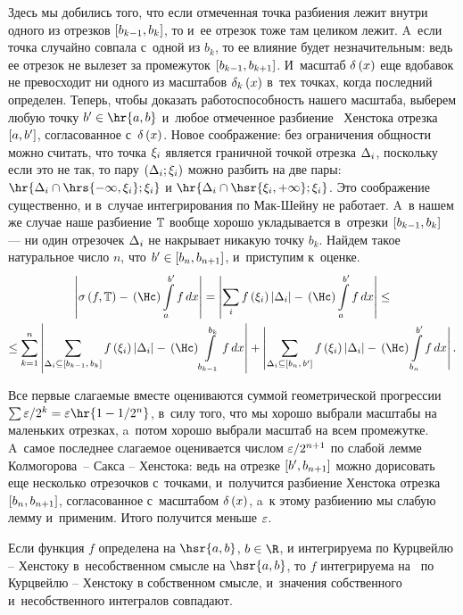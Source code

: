 \documentclass[draft]{article}
\begin{document}
Здесь мы добились того, что если отмеченная точка разбиения лежит
внутри одного из отрезков $\seg[b_{k-1},b_k]$, то и~ее отрезок тоже
там целиком лежит. A~если точка случайно совпала с~одной из $b_k$,
то ее влияние будет незначительным: ведь ее отрезок не вылезет за
промежуток $\seg[b_{k-1},b_{k+1}]$. И~масштаб $\de\atx$ еще вдобавок
не превосходит ни одного из масштабов $\de_k\atx$ в~тех точках,
когда последний определен. Теперь, чтобы доказать работоспособность
нашего масштаба, выберем любую точку $b'\in\hr{a, b}$ и~любое
отмеченное разбиение \Tdixif\ Хенстока отрезка $\seg[a,b']$,
согласованное с~$\dex$. Новое соображение: без ограничения общности
можно считать, что точка $\xi_i$ является граничной точкой отрезка
$\Delta_i$, поскольку если это не так, то пару $\dixi$ можно разбить на
две пары: $\hr{\dei\cap\hrs{-\infty,\xii};\xii}$ и
$\hr{\dei\cap\hsr{\xii,+\infty};\xii}$. Это соображение существенно,
и в~случае интегрирования по Мак-Шейну не работает. A~в нашем же
случае наше разбиение $\mathbb{T}$ вообще хорошо укладывается в~отрезки
$\seg[b_{k-1},b_k]$ --- ни один отрезочек $\Delta_i$ не накрывает
никакую точку $b_k$. Найдем такое натуральное число $n$, что
$b'\in\seg[b_{n},b_{n+1}]$, и~приступим к~оценке.
\begin{multline*}
\abs{\isum(f,\T)-\kurzh\intd[a,b']f,x} = \abs{\sumi\fxildi-\kurzh\intd[a,b']f,x} \le\\ \le
\sum_{k=1}^n\abs{\sum_{\dei\subseteq\seg[b_{k-1},\,b_k]}
\fxildi-\kurzh  \intd[b_{k-1},b_k]{  f},x} + \abs{\sum_{\dei\subseteq\seg[b_n,\,b']}
\fxildi-\kurzh\intd[b_n,b']f,x}.
\end{multline*}

Все первые слагаемые вместе оцениваются суммой геометрической
прогрессии $\sum\ep/2^k=\ep\hr{1-1/2^n}$, в~силу того, что мы хорошо
выбрали масштабы на маленьких отрезках, a~потом хорошо выбрали
масштаб на всем промежутке. A~самое последнее слагаемое оценивается
числом $\varepsilon/2^{n+1}$ по слабой лемме Колмогорова~-- Сакса --
Хенстока: ведь на отрезке $\seg[b',b_{n+1}]$ можно дорисовать еще
несколько отрезочков с~точками, и~получится разбиение Хенстока
отрезка $\seg[b_{n},b_{n+1}]$, согласованное с~масштабом $\dex$, a~к
этому разбиению мы слабую лемму и~применим. Итого получится меньше
$\varepsilon$.

\prlm

\bigskip


Если функция $f$ определена на $\hsr{a, b}$, $b\in\R$, и
интегрируема по Курцвейлю -- Хенстоку в~несобственном смысле на
$\hsr{a, b}$, то $f$ интегрируема на \ab\ по Курцвейлю -- Хенстоку
в собственном смысле, и~значения собственного и~несобственного
интегралов совпадают.
\end{document}
